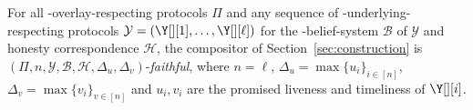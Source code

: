 \begin{conjecture}\label{conj:simulation}
  For all \rollerblade-overlay-respecting protocols $\Pi$
  and any sequence of \rollerblade-underlying-respecting
  protocols $\mathcal{Y} = (\Y[][1], \ldots, \Y[][\ell])$
  for the \rollerblade-belief-system $\mathcal{B}$ of $\mathcal{Y}$
  and honesty correspondence $\mathcal{H}$,
  the compositor \rollerblade of Section~\ref{sec:construction} is
  $(\Pi, n, \mathcal{Y}, \mathcal{B}, \mathcal{H}, \Delta_u, \Delta_v)$-\emph{faithful},
  where $n = \ell$, $\Delta_u = \max\{u_i\}_{i \in [n]}$,
  $\Delta_v = \max\{v_i\}_{v \in [n]}$
  and $u_i, v_i$ are the promised liveness and timeliness of $\Y[][i]$.
\end{conjecture}

